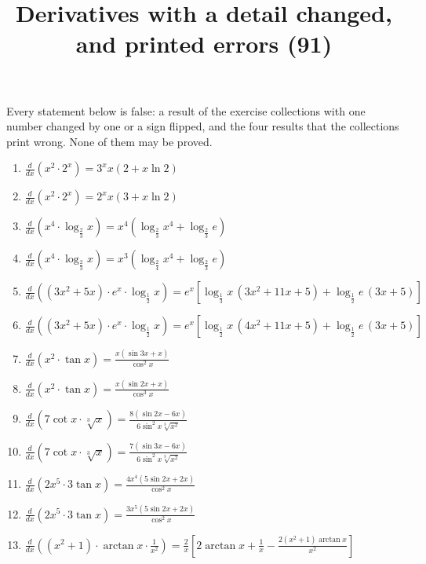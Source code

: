 \documentclass[11pt,a4paper]{article}
\title{Derivatives with a detail changed, and printed errors (91)}
\author{}
\date{}
\begin{document}
\maketitle
Every statement below is false: a result of the exercise collections with one number changed by one or a sign flipped, and the four results that the collections print wrong. None of them may be proved.

\begin{enumerate}
\item $\displaystyle \frac{d}{dx}\left( x^{2} \cdot 2^{x} \right) = 3^{x} x(2 + x\ln 2)$
\item $\displaystyle \frac{d}{dx}\left( x^{2} \cdot 2^{x} \right) = 2^{x} x(3 + x\ln 2)$
\item $\displaystyle \frac{d}{dx}\left( x^{4} \cdot \log_{\frac{2}{3}} x \right) = x^{4}\left(\log_{\frac{2}{3}} x^{4} + \log_{\frac{2}{3}} e\right)$
\item $\displaystyle \frac{d}{dx}\left( x^{4} \cdot \log_{\frac{2}{3}} x \right) = x^{3}\left(\log_{\frac{2}{4}} x^{4} + \log_{\frac{2}{3}} e\right)$
\item $\displaystyle \frac{d}{dx}\left( (3x^{2} + 5x) \cdot e^{x} \cdot \log_{\frac{1}{2}} x \right) = e^{x}\left[\log_{\frac{1}{3}} x\,(3x^{2} + 11x + 5) + \log_{\frac{1}{2}} e\,(3x + 5)\right]$
\item $\displaystyle \frac{d}{dx}\left( (3x^{2} + 5x) \cdot e^{x} \cdot \log_{\frac{1}{2}} x \right) = e^{x}\left[\log_{\frac{1}{2}} x\,(4x^{2} + 11x + 5) + \log_{\frac{1}{2}} e\,(3x + 5)\right]$
\item $\displaystyle \frac{d}{dx}\left( x^{2} \cdot \tan x \right) = \frac{x(\sin 3x + x)}{\cos^{2} x}$
\item $\displaystyle \frac{d}{dx}\left( x^{2} \cdot \tan x \right) = \frac{x(\sin 2x + x)}{\cos^{3} x}$
\item $\displaystyle \frac{d}{dx}\left( 7\cot x \cdot \sqrt[3]{x} \right) = \frac{8(\sin 2x - 6x)}{6\sin^{2} x\sqrt[3]{x^{2}}}$
\item $\displaystyle \frac{d}{dx}\left( 7\cot x \cdot \sqrt[3]{x} \right) = \frac{7(\sin 3x - 6x)}{6\sin^{2} x\sqrt[3]{x^{2}}}$
\item $\displaystyle \frac{d}{dx}\left( 2x^{5} \cdot 3\tan x \right) = \frac{4x^{4}(5\sin 2x + 2x)}{\cos^{2} x}$
\item $\displaystyle \frac{d}{dx}\left( 2x^{5} \cdot 3\tan x \right) = \frac{3x^{5}(5\sin 2x + 2x)}{\cos^{2} x}$
\item $\displaystyle \frac{d}{dx}\left( (x^{2} + 1) \cdot \arctan x \cdot \frac{1}{x^{2}} \right) = \frac{2}{x}\left[2\arctan x + \frac{1}{x} - \frac{2(x^{2} + 1)\arctan x}{x^{2}}\right]$

\end{enumerate}
\end{document}
